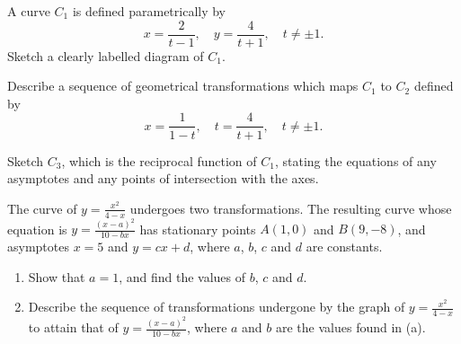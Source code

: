 \begin{problem}
    A curve $C_{1}$ is defined parametrically by \[x = \frac2{t-1}, \quad y = \frac{4}{t+1}, \quad t \neq \pm 1.\] Sketch a clearly labelled diagram of $C_{1}$.

    Describe a sequence of geometrical transformations which maps $C_{1}$ to $C_{2}$ defined by \[x = \frac1{1-t}, \quad t = \frac4{t+1}, \quad t \neq \pm 1.\]

    Sketch $C_{3}$, which is the reciprocal function of $C_{1}$, stating the equations of any asymptotes and any points of intersection with the axes.
\end{problem}

\begin{problem}[\chili]
    The curve of $y = \frac{x^2}{4-x}$ undergoes two transformations. The resulting curve whose equation is $y=\frac{(x-a)^2}{10-bx}$ has stationary points $A(1, 0)$ and $B(9,-8)$, and asymptotes $x=5$ and $y=cx+d$, where $a$, $b$, $c$ and $d$ are constants.

    \begin{figure}[H]
        \centering
    \end{figure}

    \begin{enumerate}
        \item Show that $a=1$, and find the values of $b$, $c$ and $d$.
        \item Describe the sequence of transformations undergone by the graph of $y= \frac{x^2}{4-x}$ to attain that of $y=\frac{(x-a)^2}{10-bx}$, where $a$ and $b$ are the values found in (a).
    \end{enumerate}
\end{problem}